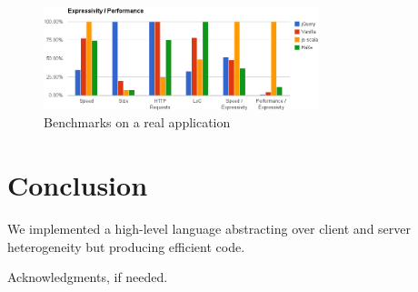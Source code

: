 \documentclass[preprint]{sigplanconf}
\begin{document}
\begin{figure}
\centering
\includegraphics[width=8cm]{chooze.png}
\caption{Benchmarks on a real application}
\label{benchmark}
\end{figure}


\section{Conclusion}
\label{discussion}

We implemented a high-level language abstracting over client and server heterogeneity but producing efficient code.

%
%
\acks

Acknowledgments, if needed.



%
%
%
\end{document}
